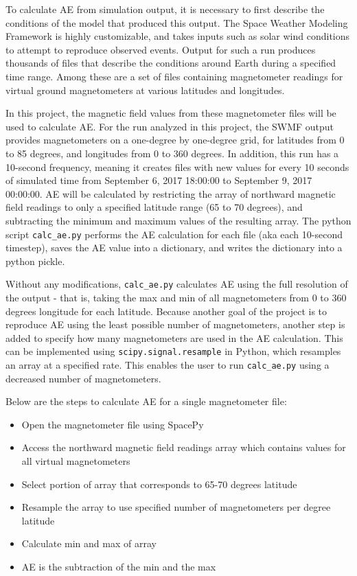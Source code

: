 \documentclass[12pt, letterpaper]{article}
\begin{document}
To calculate AE from simulation output, it is necessary to first describe the conditions of the model that produced this output. The Space Weather Modeling Framework is highly customizable, and takes inputs such as solar wind conditions to attempt to reproduce observed events. Output for such a run produces thousands of files that describe the conditions around Earth during a specified time range. Among these are a set of files containing magnetometer readings for virtual ground magnetometers at various latitudes and longitudes.

In this project, the magnetic field values from these magnetometer files will be used to calculate AE. For the run analyzed in this project, the SWMF output provides magnetometers on a one-degree by one-degree grid, for latitudes from 0 to 85 degrees, and longitudes from 0 to 360 degrees. In addition, this run has a 10-second frequency, meaning it creates files with new values for every 10 seconds of simulated time from September 6, 2017 18:00:00 to September 9, 2017 00:00:00.
AE will be calculated by restricting the array of northward magnetic field readings to only a specified latitude range (65 to 70 degrees), and subtracting the minimum and maximum values of the resulting array. The python script \texttt{calc\_ae.py} performs the AE calculation for each file (aka each 10-second timestep), saves the AE value into a dictionary, and writes the dictionary into a python pickle.

Without any modifications, \texttt{calc\_ae.py} calculates AE using the full resolution of the output - that is, taking the max and min of all magnetometers from 0 to 360 degrees longitude for each latitude. Because another goal of the project is to reproduce AE using the least possible number of magnetometers, another step is added to specify how many magnetometers are used in the AE calculation. This can be implemented using \texttt{scipy.signal.resample} in Python, which resamples an array at a specified rate. This enables the user to run \texttt{calc\_ae.py} using a decreased number of magnetometers.

Below are the steps to calculate AE for a single magnetometer file:
\begin{itemize}
  \item Open the magnetometer file using SpacePy
  \item Access the northward magnetic field readings array which contains values for all virtual magnetometers
  \item Select portion of array that corresponds to 65-70 degrees latitude
  \item Resample the array to use specified number of magnetometers per degree latitude
  \item Calculate min and max of array
  \item AE is the subtraction of the min and the max
\end{itemize}
\end{document}
